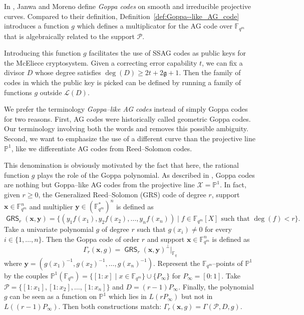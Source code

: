 \documentclass[a4paper]{amsart}
\theoremstyle{definition}
\theoremstyle{remark}
\newcommand{\calP}{\mathcal{P}}
\newcommand{\calL}{\mathcal{L}}
\newcommand{\calX}{\mathcal{X}}
\newcommand{\fqm}{\mathbb{F}_{q^m}}
\newcommand{\fq}{\mathbb{F}_{q}}
\newcommand{\PP}{\mathbb{P}}
\newcommand{\GRS}{\operatorname{\mathsf{GRS}}}
\begin{document}
In \cite{JM96}, Janwa and Moreno define \emph{Goppa codes} on smooth and irreducible projective curves. Compared to their definition, Definition~\ref{def:Goppa--like_AG_code} introduces a function $g$ which defines a multiplicator for the AG code over $\fqm$ that is algebraically related to the support $\calP$.

Introducing this function $g$ facilitates the use of SSAG codes as public keys for the McEliece cryptosystem. Given a correcting error capability $t$, we can fix a divisor $D$ whose degree satisfies $\deg (D) \geq 2t + 2\mathfrak{g}+1$. Then the family of codes in which the public key is picked can be defined by running a family of functions $g$ outside $\calL(D)$.

\medskip

We prefer the terminology \emph{Goppa--like AG codes} instead of simply Goppa codes for two reasons. First, AG codes were historically called geometric Goppa codes. Our terminology involving both the words  and  removes this possible ambiguity. Second, we want to emphasize the use of a different curve than the projective line $\PP^1$, like we differentiate AG codes from Reed--Solomon codes.

This denomination is obviously motivated by the fact that here, the rational function $g$ plays the role of the Goppa polynomial. As described in \cite[Example~9.1.8]{Sti09}, Goppa codes are nothing but Goppa--like AG codes from the projective line $\calX=\PP^1$. In fact, given $r \geq 0$, the Generalized Reed--Solomon (GRS) code of degree $r$, support $\mathbf{x} \in \fqm^n$ and multiplier $\mathbf{y} \in (\fqm^*)^n$ is defined as
\[\GRS_r(\mathbf{x},\mathbf{y})=\{(y_1f(x_1),y_2f(x_2),\dots,y_nf(x_n)) \mid f \in \fqm[X] \text{ such that } \deg (f) < r \}.\]
Take a univariate polynomial $g$ of degree $r$ such that $g(x_i) \neq 0$ for every  $i \in \{1,\dots,n\}$. Then the Goppa code of order $r$ and support $\mathbf{x} \in \fqm^n$ is defined as
\begin{equation}\label{eq:classical_Goppa}\Gamma_r(\mathbf{x},g)= \GRS_r(\mathbf{x},\mathbf{y})^\perp|_{\fq}
	\end{equation}
where $\mathbf{y}=(g(x_1)^{-1},g(x_2)^{-1},\dots,g(x_n)^{-1})$.
Represent the $\fqm$--points of $\PP^1$ by the couples $\PP^1(\fqm)=\{[1:x] \mid x \in \fqm\} \cup \{P_\infty\}$ for $P_\infty=[0:1]$. Take $\calP=\{[1:x_1],[1:x_2],\dots,[1:x_n]\}$ and $D=(r-1)P_\infty$. Finally, the polynomial $g$ can be seen as a function on $\PP^1$ which lies in $L(rP_\infty)$ but not in $L((r-1)P_\infty)$. Then both constructions match: $\Gamma_r(\mathbf{x},g)=\Gamma(\calP,D,g)$.
\end{document}
